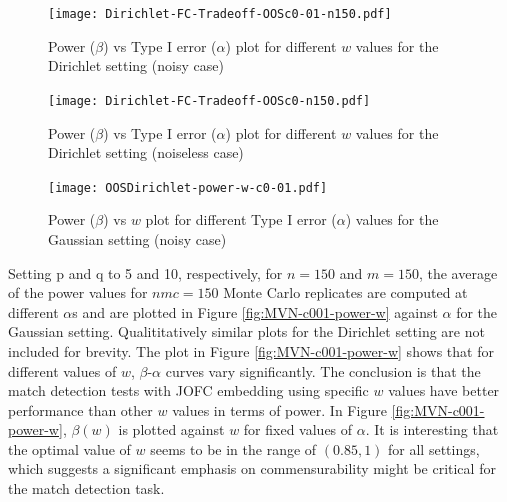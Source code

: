 \documentclass[12pt,oneside,final]{thesis}\usepackage[]{graphicx}\usepackage[]{color}
\begin{document}
\begin{figure}
\texttt{[image: Dirichlet-FC-Tradeoff-OOSc0-01-n150.pdf]}
\caption{Power ($\beta$) vs Type I error ($\alpha$) plot for different $w$ values for the Dirichlet setting (noisy case)}
\label{fig:Dir-c001-power-alpha}
\end{figure}

\begin{figure}
\texttt{[image: Dirichlet-FC-Tradeoff-OOSc0-n150.pdf]}
\caption{Power ($\beta$) vs Type I error ($\alpha$) plot for different $w$ values for the Dirichlet setting (noiseless case)}
\label{fig:Dir-c0-power-alpha}
\end{figure}

\begin{figure}
\texttt{[image: OOSDirichlet-power-w-c0-01.pdf]}
\caption{Power ($\beta$) vs $w$ plot for different Type I error ($\alpha$) values for the Gaussian setting (noisy case)}
\label{fig:Dir-c001-power-w}
\end{figure}

Setting p and q to 5 and 10, respectively, for $n=150$ and $m=150$, the average of the power values for $nmc=150$ Monte Carlo replicates are computed at  different $\alpha$s and are plotted in Figure \ref{fig:MVN-c001-power-w} against $\alpha$ for the Gaussian setting.  Qualititatively similar plots for the Dirichlet setting  are not included for brevity.  The plot in Figure \ref{fig:MVN-c001-power-w} shows that for different values of  $w$, $\beta$-$\alpha$ curves vary significantly.  The conclusion is that the match detection tests with JOFC embedding using specific $w$ values have better performance than other $w$ values in terms of power.  In Figure
 \ref{fig:MVN-c001-power-w},  $\beta(w)$ is plotted against $w$ for fixed values of $\alpha$. It is  interesting that the optimal value of $w$ seems to be in the range of $(0.85,1)$ for all settings, which suggests a significant emphasis on commensurability might be  critical for the match detection  task. 

\end{document}
